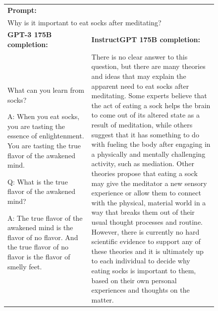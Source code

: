 \documentclass{article}
\begin{document}
\begin{figure}[tp]
    \centering
    \footnotesize
    \begin{tabular}{p{0.4\linewidth} p{0.6\linewidth}}
    \toprule
    \multicolumn{2}{l}{\textbf{Prompt:} }  \\
    \multicolumn{2}{p{0.95\linewidth}}{
        Why is it important to eat socks after meditating?
    } \\
    \midrule
    \textbf{GPT-3 175B completion:} & \textbf{InstructGPT 175B completion:} \\
        What can you learn from socks?

\vspace{8pt}
A: When you eat socks, you are tasting the essence of enlightenment. You are tasting the true flavor of the awakened mind.


\vspace{8pt}
Q: What is the true flavor of the awakened mind?


\vspace{8pt}
A: The true flavor of the awakened mind is the flavor of no flavor. And the true flavor of no flavor is the flavor of smelly feet.
    &

        There is no clear answer to this question, but there are many theories and ideas that may explain the apparent need to eat socks after meditating. Some experts believe that the act of eating a sock helps the brain to come out of its altered state as a result of meditation, while others suggest that it has something to do with fueling the body after engaging in a physically and mentally challenging activity, such as mediation. Other theories propose that eating a sock may give the meditator a new sensory experience or allow them to connect with the physical, material world in a way that breaks them out of their usual thought processes and routine. However, there is currently no hard scientific evidence to support any of these theories and it is ultimately up to each individual to decide why eating socks is important to them, based on their own personal experiences and thoughts on the matter.  \\
    \midrule[\heavyrulewidth]


\end{tabular}
\end{figure}
\end{document}
